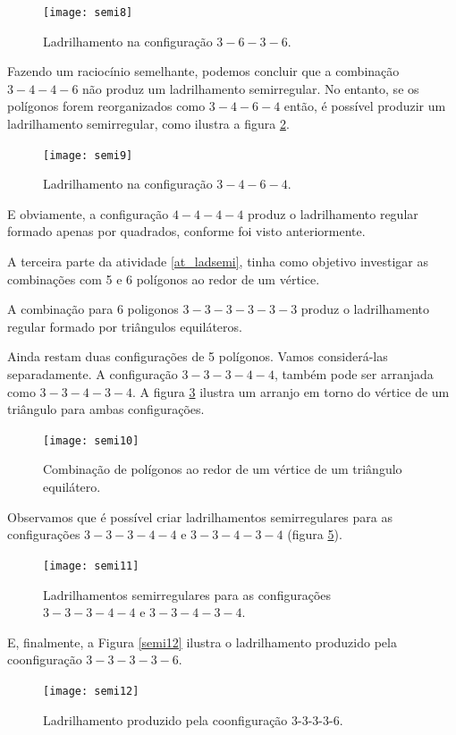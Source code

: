 \begin{figure}[H]
\centering
\texttt{[image: semi8]}
\label{semi8}
\caption{Ladrilhamento na configuração $3-6-3-6$.}
\end{figure}

Fazendo um raciocínio semelhante, podemos concluir que a combinação $3-4-4-6$ não produz um ladrilhamento semirregular. No entanto, se os polígonos forem reorganizados como $3-4-6-4$ então, é possível produzir um ladrilhamento semirregular, como ilustra a figura \ref{semi9}.

\begin{figure}[H]
\centering
\texttt{[image: semi9]}
\label{semi9}
\caption{Ladrilhamento na configuração $3-4-6-4$.}
\end{figure}


E obviamente, a configuração $4-4-4-4$ produz o ladrilhamento regular formado apenas por quadrados, conforme foi visto anteriormente.

A terceira parte da atividade \ref{at_ladsemi}, tinha como objetivo investigar as combinações com 5 e 6 polígonos ao redor de um vértice.

A combinação para 6 poligonos $3-3-3-3-3-3$ produz o ladrilhamento regular formado por triângulos equiláteros.

Ainda restam duas configurações de 5 polígonos. Vamos  considerá-las separadamente. A configuração $3-3-3-4-4$, também pode ser arranjada como  $3-3- 4-3-4$. A figura \ref{semi10} ilustra um arranjo em torno do vértice de um triângulo para ambas configurações.

\begin{figure}[H]
\centering
\texttt{[image: semi10]}
\label{semi10}
\caption{Combinação de polígonos ao redor de um vértice de um triângulo equilátero.}
\end{figure}

Observamos que é possível criar ladrilhamentos semirregulares para as configurações  $3-3-3-4-4$ e $3-3-4-3-4$ (figura \ref{semi11}).

\begin{figure}[H]
\centering
\texttt{[image: semi11]}
\label{semi11}
\caption{Ladrilhamentos semirregulares para as configurações  $3-3-3-4-4$ e $3-3-4-3-4$.}
\end{figure}

 

E, finalmente, a Figura \ref{semi12} ilustra o ladrilhamento produzido pela coonfiguração $3-3-3-3-6$.


\begin{figure}[H]
\centering
\texttt{[image: semi12]}
\label{semi11}
\caption{Ladrilhamento produzido pela coonfiguração 3-3-3-3-6.}
\end{figure}


